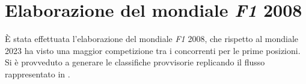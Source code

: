 \documentclass[12pt,a4paper,openright,twoside]{book}
\begin{document}
 \begin{table}[H]
    \centering
    \begingroup
    \endgroup

    \caption{Campionato \textit{F1} 2023 - Valori di distanza ottenuti applicando la 
    \textit{norma di Frobenius} alla differenza delle matrici rappresentate nelle prime due colonne.
    }
    \label{table:distanzef12023}
\end{table}

\section{Elaborazione del mondiale \textit{F1} 2008}


È stata effettuata l'elaborazione del mondiale \textit{F1} 2008, che rispetto al mondiale 2023 ha visto
una maggior competizione tra i concorrenti per le prime posizioni. Si è provveduto a generare le classifiche provvisorie 
replicando il flusso rappresentato in \label{capitoloelaborazionemondiale}.
\end{document}

